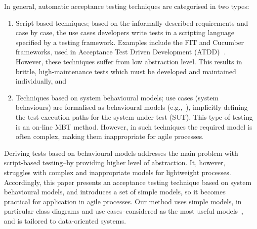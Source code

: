 %
%

\label{sec:background}
In general, automatic acceptance testing techniques are categorised in two types:
\begin{enumerate}
	\item Script-based techniques; based on the informally described requirements and case by case, the use cases developers write tests in a scripting language specified by a testing framework. Examples include the FIT and Cucumber frameworks, used in Acceptance Test Driven Development (ATDD)~\cite{Pugh2011}. However, these techniques suffer from low abstraction level. This results in	brittle, high-maintenance tests which must be developed and maintained individually, and
	
	\item Techniques based on system behavioural models;  use cases (system behaviours) are formalised as behavioural models (e.g.,~\cite{Nebut2006,Sarma2007,Kaplan2008}), implicitly defining the test execution paths for the system under test (SUT). This type of testing is an on-line MBT method. However, in such techniques the required model is often complex, making them inappropriate for agile processes.

\end{enumerate} 

Deriving tests based on behavioural models addresses the main problem with script-based testing--by providing higher level of abstraction. It, however, struggles with complex and inappropriate models for lightweight processes. Accordingly, this paper presents an acceptance testing technique based on system behavioural models, and introduces a set of simple models, so it becomes practical for application in agile processes. Our method uses simple models, in particular class diagrams and use cases--considered as the most useful models~\cite{Erickson2007,Erickson2008}, and is tailored to data-oriented systems.
